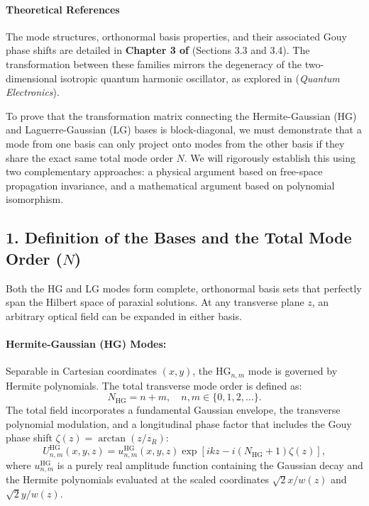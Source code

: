\begin{resolucao}[Solution]

    \paragraph*{Theoretical References}
    The mode structures, orthonormal basis properties, and their associated Gouy phase shifts are detailed in \textbf{Chapter 3 of } (Sections 3.3 and 3.4). The transformation between these families mirrors the degeneracy of the two-dimensional isotropic quantum harmonic oscillator, as explored in \textbf{} (\textit{Quantum Electronics}).

    To prove that the transformation matrix connecting the Hermite-Gaussian (HG) and Laguerre-Gaussian (LG) bases is block-diagonal, we must demonstrate that a mode from one basis can only project onto modes from the other basis if they share the exact same total mode order $N$. We will rigorously establish this using two complementary approaches: a physical argument based on free-space propagation invariance, and a mathematical argument based on polynomial isomorphism.

    \subsection*{1. Definition of the Bases and the Total Mode Order ($N$)}

        Both the HG and LG modes form complete, orthonormal basis sets that perfectly span the Hilbert space of paraxial solutions. At any transverse plane $z$, an arbitrary optical field can be expanded in either basis.
    
        \paragraph*{Hermite-Gaussian (HG) Modes:}
        Separable in Cartesian coordinates $(x,y)$, the HG$_{n,m}$ mode is governed by Hermite polynomials. The total transverse mode order is defined as:
        \[
        N_{\text{HG}} = n + m, \quad n,m \in \{0, 1, 2, \dots\}.
        \]
        The total field incorporates a fundamental Gaussian envelope, the transverse polynomial modulation, and a longitudinal phase factor that includes the Gouy phase shift $\zeta(z) = \arctan(z/z_R)$:
        \[
        U_{n,m}^{\text{HG}}(x,y,z) = u_{n,m}^{\text{HG}}(x,y,z) \exp\left[ i k z - i(N_{\text{HG}} + 1)\zeta(z) \right],
        \]
        where $u_{n,m}^{\text{HG}}$ is a purely real amplitude function containing the Gaussian decay and the Hermite polynomials evaluated at the scaled coordinates $\sqrt{2}x/w(z)$ and $\sqrt{2}y/w(z)$.
    

\end{resolucao}
